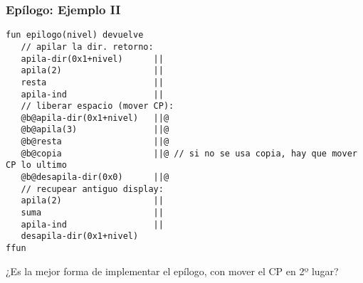 \documentclass[hyperref={pdfpagelabels=false},tree-dvips,compress]{beamer}
\begin{document}
\begin{frame}[fragile]
\frametitle{Epílogo: Ejemplo II}

\begin{lstlisting}[style=codigoMP,basicstyle=\tiny\ttfamily]
fun epilogo(nivel) devuelve
   // apilar la dir. retorno:
   apila-dir(0x1+nivel)      ||
   apila(2)                  ||
   resta                     ||
   apila-ind                 ||
   // liberar espacio (mover CP):
   @b@apila-dir(0x1+nivel)   ||@
   @b@apila(3)               ||@
   @b@resta                  ||@
   @b@copia                  ||@ // si no se usa copia, hay que mover CP lo ultimo
   @b@desapila-dir(0x0)      ||@
   // recupear antiguo display:
   apila(2)                  ||
   suma                      ||
   apila-ind                 ||
   desapila-dir(0x1+nivel)
ffun
\end{lstlisting}

¿Es la mejor forma de implementar el epílogo, con mover el CP en 2º lugar?

\end{frame}
\end{document}
